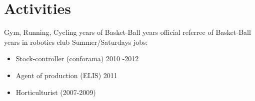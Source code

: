 \documentclass[letterpaper]{jm-cv} %
\begin{document}

\section{Activities}

Gym, Running, Cycling  years of Basket-Ball  years official referree of Basket-Ball  years in robotics club \newline
\newline
Summer/Saturdays jobs:
\begin{itemize}
\item Stock-controller (conforama) 2010 -2012
\item Agent of production (ELIS) 2011
\item Horticulturist (2007-2009)
\end{itemize}
\end{document}
